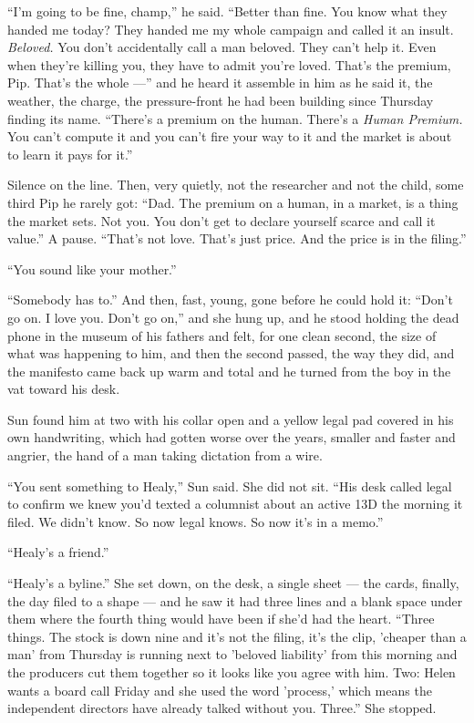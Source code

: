 \documentclass[11pt,openany]{book}
\newcommand{\scenebreak}{\par\vspace{0.5\baselineskip}\begin{center}\textasteriskcentered\quad\textasteriskcentered\quad\textasteriskcentered\end{center}\vspace{0.5\baselineskip}\par}
\begin{document}
``I'm going to be fine, champ,'' he said. ``Better than fine. You know what they handed me today? They handed me my whole campaign and called it an insult. \textit{Beloved.} You don't accidentally call a man beloved. They can't help it. Even when they're killing you, they have to admit you're loved. That's the premium, Pip. That's the whole ---'' and he heard it assemble in him as he said it, the weather, the charge, the pressure-front he had been building since Thursday finding its name. ``There's a premium on the human. There's a \textit{Human Premium.} You can't compute it and you can't fire your way to it and the market is about to learn it pays for it.''

Silence on the line. Then, very quietly, not the researcher and not the child, some third Pip he rarely got: ``Dad. The premium on a human, in a market, is a thing the market sets. Not you. You don't get to declare yourself scarce and call it value.'' A pause. ``That's not love. That's just price. And the price is in the filing.''

``You sound like your mother.''

``Somebody has to.'' And then, fast, young, gone before he could hold it: ``Don't go on. I love you. Don't go on,'' and she hung up, and he stood holding the dead phone in the museum of his fathers and felt, for one clean second, the size of what was happening to him, and then the second passed, the way they did, and the manifesto came back up warm and total and he turned from the boy in the vat toward his desk.


\scenebreak


Sun found him at two with his collar open and a yellow legal pad covered in his own handwriting, which had gotten worse over the years, smaller and faster and angrier, the hand of a man taking dictation from a wire.

``You sent something to Healy,'' Sun said. She did not sit. ``His desk called legal to confirm we knew you'd texted a columnist about an active 13D the morning it filed. We didn't know. So now legal knows. So now it's in a memo.''

``Healy's a friend.''

``Healy's a byline.'' She set down, on the desk, a single sheet --- the cards, finally, the day filed to a shape --- and he saw it had three lines and a blank space under them where the fourth thing would have been if she'd had the heart. ``Three things. The stock is down nine and it's not the filing, it's the clip, 'cheaper than a man' from Thursday is running next to 'beloved liability' from this morning and the producers cut them together so it looks like you agree with him. Two: Helen wants a board call Friday and she used the word 'process,' which means the independent directors have already talked without you. Three.'' She stopped.
\end{document}
